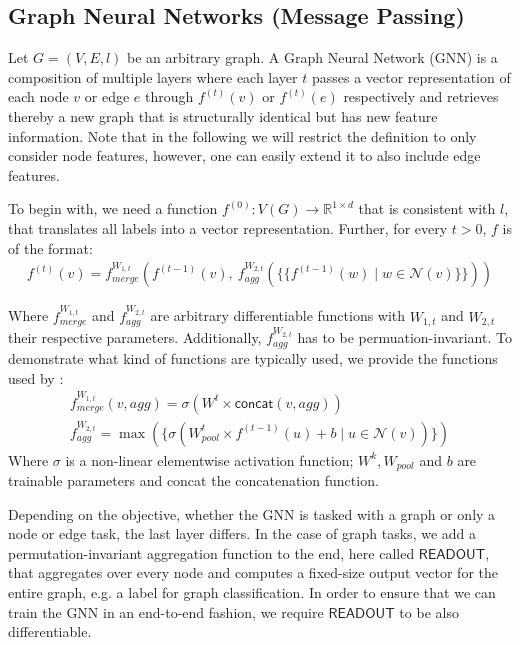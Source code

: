 \documentclass[11pt, dvipsnames, DIV=12]{scrreprt}
\theoremstyle{definition}
\newcommand{\MSopen}{\{\!\!\{}
\newcommand{\MSclose}{\}\!\!\}}
\begin{document}
\subsection{Graph Neural Networks (Message Passing)}\label{sec:GNN Defintion}
Let $G = (V, E, l)$ be an arbitrary graph. A Graph Neural Network (GNN) is a composition of multiple layers where each layer $t$ passes a vector representation of each node $v$ or edge $e$ through $f^{(t)}(v)$ or $f^{(t)}(e)$ respectively and retrieves thereby a new graph that is structurally identical but has new feature information. Note that in the following we will restrict the definition to only consider node features, however, one can easily extend it to also include edge features. 

To begin with, we need a function $f^{(0)}: V(G) \rightarrow \mathbb{R}^{1 \times d}$ that is consistent with $l$, that translates all labels into a vector representation. Further, for every $t > 0$, $f$ is of the format:
\begin{align}
f^{(t)}(v) = f^{W_{1,t}}_{merge} (f^{(t-1)}(v), \  f^{W_{2,t}}_{agg}( \MSopen f^{(t-1)}(w) \mid w \in \mathcal{N}(v) \MSclose ))
\end{align}

\noindent Where $f^{W_{1,t}}_{merge}$ and $f^{W_{2,t}}_{agg}$ are arbitrary differentiable functions with $W_{1,t}$ and $W_{2,t}$ their respective parameters. Additionally, $f^{W_{2,t}}_{agg}$ has to be permuation-invariant. To demonstrate what kind of functions are typically used, we provide the functions used by \cite{Ham+2017}:
\begin{align}
    f^{W_{1,t}}_{merge}(v, agg) = \sigma (W^t \times \textsf{concat}(v, agg))\\
    f^{W_{2,t}}_{agg} = \max(\{ \sigma(W_{pool}^t \times f^{(t-1)}(u) + b \mid u \in \mathcal{N}(v))\})
\end{align}
\noindent Where $\sigma$ is a non-linear elementwise activation function; $W^k, W_{pool}$ and $b$ are trainable parameters and \textsf{concat} the concatenation function.

Depending on the objective, whether the GNN is tasked with a graph or only a node or edge task, the last layer differs. In the case of graph tasks, we add a permutation-invariant aggregation function to the end, here called $\textsf{READOUT}$, that aggregates over every node and computes a fixed-size output vector for the entire graph, e.g. a label for graph classification. In order to ensure that we can train the GNN in an end-to-end fashion, we require $\textsf{READOUT}$ to be also differentiable.
\end{document}
